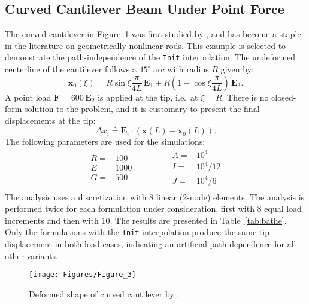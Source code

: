 \subsection{Curved Cantilever Beam Under Point Force}\label{sec:bathe}
%
The curved cantilever in Figure~\ref{fig:bathe} was first studied
by \cite{bathe1979large}, and has become a staple in the literature
on geometrically nonlinear rods. 
This example is selected to demonstrate the path-independence of the \texttt{Init} interpolation.
The undeformed centerline of the cantilever follows a \(45^\circ\) arc with radius \(R\) given by:
\[
\boldsymbol{x}_0(\xi) = R \sin \xi \frac{\pi}{4L}\, \mathbf{E}_1 
                      + R \left(1 - \cos \xi \frac{\pi}{4L}\right)\, \mathbf{E}_3.
\]
A point load \(\boldsymbol{F} = 600 \, \mathbf{E}_2\) is applied
at the tip, i.e.\ at \(\xi = R\).
There is no closed-form solution to the problem, and it is customary
to present the final displacements at the tip:
\[
\Delta x_i \triangleq \mathbf{E}_i \cdot \left(\boldsymbol{x}(L) - \boldsymbol{x}_0(L)\right).
\]
%
The following parameters are used for the simulations:
\[
\begin{array}{lr}
    R  =& 100 \\ %
    E  =& 1000 \\ %
    G  =& 500 \\ %
\end{array}
\qquad\qquad
\begin{array}{ll}
    A  =& 10^4    \\
    I  =& 10^4/12 \\
    J  =& 10^4/6  \\
\end{array}
\]
The analysis uses a discretization with 8 linear (2-node) elements.
The analysis is performed twice for each formulation under consideration,
first with 8 equal load increments and then with 10.
The results are presented in Table~\ref{tab:bathe}.
Only the formulations with the \texttt{Init} interpolation
produce the same tip displacement in both load cases, indicating
an artificial path dependence for all other variants.
% 

\begin{figure}
    \centering
    \texttt{[image: Figures/Figure\_3]}
    \caption{Deformed shape of curved cantilever by \cite{bathe1979large}.}
    \label{fig:bathe}
\end{figure}
%

